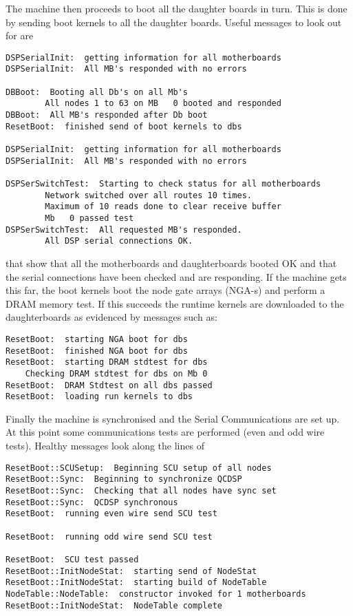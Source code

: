 The machine then proceeds to boot all the daughter boards in turn.
This is done by sending boot kernels to all the daughter boards. 
Useful messages to look out for are 
\begin{verbatim}
DSPSerialInit:  getting information for all motherboards
DSPSerialInit:  All MB's responded with no errors

DBBoot:  Booting all Db's on all Mb's
        All nodes 1 to 63 on MB   0 booted and responded
DBBoot:  All MB's responded after Db boot
ResetBoot:  finished send of boot kernels to dbs

DSPSerialInit:  getting information for all motherboards
DSPSerialInit:  All MB's responded with no errors

DSPSerSwitchTest:  Starting to check status for all motherboards
        Network switched over all routes 10 times.
        Maximum of 10 reads done to clear receive buffer
        Mb   0 passed test
DSPSerSwitchTest:  All requested MB's responded.
        All DSP serial connections OK.
\end{verbatim} 
that show that all the motherboards and daughterboards booted OK and 
that the serial connections have been checked and are responding.
If the machine gets this far, the boot kernels boot the node gate
arrays (NGA-s) and perform a DRAM memory test. If this succeeds
the runtime kernels are downloaded to the daughterboards as 
evidenced by messages such as:
\begin{verbatim}
ResetBoot:  starting NGA boot for dbs
ResetBoot:  finished NGA boot for dbs
ResetBoot:  starting DRAM stdtest for dbs
	Checking DRAM stdtest for dbs on Mb 0
ResetBoot:  DRAM Stdtest on all dbs passed
ResetBoot:  loading run kernels to dbs
\end{verbatim}
Finally the machine is synchronised and the Serial Communications
are set up. At this point some communications tests are performed
(even and odd wire tests). Healthy messages look along the lines
of
\begin{verbatim}
ResetBoot::SCUSetup:  Beginning SCU setup of all nodes
ResetBoot::Sync:  Beginning to synchronize QCDSP
ResetBoot::Sync:  Checking that all nodes have sync set
ResetBoot::Sync:  QCDSP synchronous
ResetBoot:  running even wire send SCU test 

ResetBoot:  running odd wire send SCU test 

ResetBoot:  SCU test passed
ResetBoot::InitNodeStat:  starting send of NodeStat
ResetBoot::InitNodeStat:  starting build of NodeTable
NodeTable::NodeTable:  constructor invoked for 1 motherboards
ResetBoot::InitNodeStat:  NodeTable complete
\end{verbatim}

